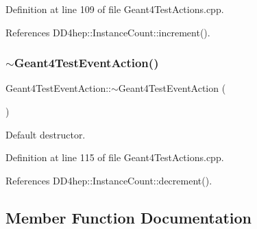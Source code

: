 Definition at line 109 of file Geant4\+Test\+Actions.\+cpp.



References D\+D4hep\+::\+Instance\+Count\+::increment().

\hypertarget{class_d_d4hep_1_1_simulation_1_1_test_1_1_geant4_test_event_action_abef0a0d05514f5882003ae2f45e59ed7}{}\label{class_d_d4hep_1_1_simulation_1_1_test_1_1_geant4_test_event_action_abef0a0d05514f5882003ae2f45e59ed7} 
\subsubsection{\texorpdfstring{$\sim$\+Geant4\+Test\+Event\+Action()}{~Geant4TestEventAction()}}
{\footnotesize\ttfamily Geant4\+Test\+Event\+Action\+::$\sim$\+Geant4\+Test\+Event\+Action (\begin{DoxyParamCaption}{ }\end{DoxyParamCaption})\hspace{0.3cm}{\ttfamily [virtual]}}



Default destructor. 



Definition at line 115 of file Geant4\+Test\+Actions.\+cpp.



References D\+D4hep\+::\+Instance\+Count\+::decrement().



\subsection{Member Function Documentation}
\hypertarget{class_d_d4hep_1_1_simulation_1_1_test_1_1_geant4_test_event_action_a9bce3a0885c7d2d5c6b03756ea3c4e23}{}\label{class_d_d4hep_1_1_simulation_1_1_test_1_1_geant4_test_event_action_a9bce3a0885c7d2d5c6b03756ea3c4e23} 
